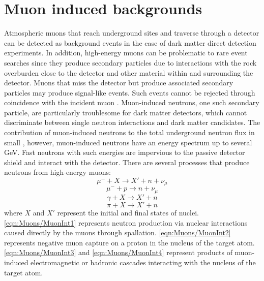 \section{Muon induced backgrounds}\label{sec:Muons/InducedBackgrounds}
Atmospheric muons that reach underground sites and traverse through a detector can be detected as background events in the case of dark matter direct detection experiments. In addition, high-energy muons can be problematic to rare event searches since they produce secondary particles due to interactions with the rock overburden close to the detector and other material within and surrounding the detector. Muons that miss the detector but produce associated secondary particles may produce signal-like events. Such events cannot be rejected through coincidence with the incident muon \cite{mei,Lindote:2008nq}. Muon-induced neutrons, one such secondary particle, are particularly troublesome for dark matter detectors, which cannot discriminate between single neutron interactions and dark matter candidates. The contribution of muon-induced neutrons to the total underground neutron flux in small \cite{LZ_SIMS}, however, muon-induced neutrons have an energy spectrum up to several GeV. Fast neutrons with such energies are impervious to the passive detector shield and interact with the detector. There are several processes that produce neutrons from high-energy muons:
\begin{equation}\label{eqn:Muons/MuonInt1}
    \mu^-+X\rightarrow X' + n+\nu_\mu
\end{equation}
\begin{equation}\label{eqn:Muons/MuonInt2}
    \mu^-+p\rightarrow n+\nu_\mu
\end{equation}
\begin{equation}\label{eqn:Muons/MuonInt3}
    \gamma+X\rightarrow X'+n
\end{equation}
\begin{equation}\label{eqn:Muons/MuonInt4}
    \pi+X\rightarrow X'+n
\end{equation} 
where $X$ and $X'$ represent the initial and final states of nuclei. \autoref{eqn:Muons/MuonInt1} represents neutron production via nuclear interactions caused directly by the muons through spallation. \autoref{eqn:Muons/MuonInt2} represents negative muon capture on a proton in the nucleus of the target atom. \autoref{eqn:Muons/MuonInt3} and \autoref{eqn:Muons/MuonInt4} represent products of muon-induced electromagnetic or hadronic cascades interacting with the nucleus of the target atom.

